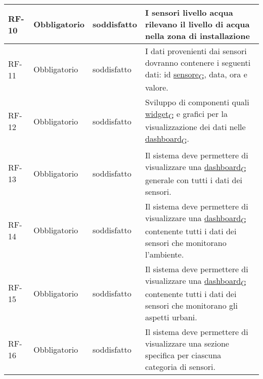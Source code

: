 \begin{longtable}{|>{\centering\arraybackslash}m{}|>{\centering\arraybackslash}m{}|>{\centering\arraybackslash}m{}|>{\centering\arraybackslash}m{}|}
	\\\hline
	RF-10           & Obbligatorio        & soddisfatto & I sensori livello acqua rilevano il livello di acqua nella zona di installazione
	\\\hline
	RF-11           & Obbligatorio        & soddisfatto & I dati provenienti dai sensori dovranno contenere i seguenti dati: id \href{https://7last.github.io/docs/pb/documentazione-interna/glossario\#sensore}{sensore\textsubscript{G}}, data, ora e valore.
	\\\hline
	RF-12           & Obbligatorio        & soddisfatto & Sviluppo di componenti quali \href{https://7last.github.io/docs/pb/documentazione-interna/glossario\#widget}{widget\textsubscript{G}} e grafici per la visualizzazione dei dati nelle \href{https://7last.github.io/docs/pb/documentazione-interna/glossario\#dashboard}{dashboard\textsubscript{G}}.
	\\\hline
	RF-13           & Obbligatorio        & soddisfatto                                                                                                          & Il sistema deve permettere di visualizzare una \href{https://7last.github.io/docs/pb/documentazione-interna/glossario\#dashboard}{dashboard\textsubscript{G}} generale con tutti i dati dei sensori.
	\\\hline
	RF-14           & Obbligatorio        & soddisfatto                                                                                                           & Il sistema deve permettere di visualizzare una \href{https://7last.github.io/docs/pb/documentazione-interna/glossario\#dashboard}{dashboard\textsubscript{G}} contenente tutti i dati dei sensori che monitorano l'ambiente.
	\\\hline
	RF-15           & Obbligatorio        & soddisfatto                                                                                                           & Il sistema deve permettere di visualizzare una \href{https://7last.github.io/docs/pb/documentazione-interna/glossario\#dashboard}{dashboard\textsubscript{G}} contenente tutti i dati dei sensori che monitorano gli aspetti urbani.
	\\\hline
	RF-16           & Obbligatorio        & soddisfatto                                                                                                           & Il sistema deve permettere di visualizzare una sezione specifica per ciascuna categoria di sensori.
	\\\hline

\end{longtable}

